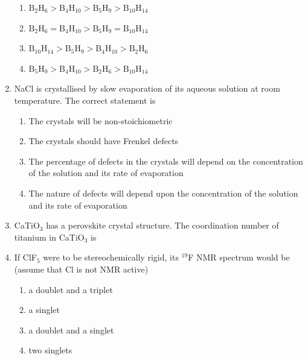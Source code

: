 \documentclass[12pt]{article}
\begin{document}
\begin{enumerate}
\begin{enumerate}
    \item $\mathrm{B_2H_6 > B_4H_{10} > B_5H_9 > B_{10}H_{14}}$
    \item $\mathrm{B_2H_6 = B_4H_{10} > B_5H_9 = B_{10}H_{14}}$
    \item $\mathrm{B_{10}H_{14} > B_5H_9 > B_4H_{10} > B_2H_6}$
    \item $\mathrm{B_5H_9 > B_4H_{10} > B_2H_6 > B_{10}H_{14}}$
\end{enumerate}  \hfill{}


\item NaCl is crystallised by slow evaporation of its aqueous solution at room temperature. The correct statement is
\begin{enumerate}
\item  The crystals will be non-stoichiometric
\item  The crystals should have Frenkel defects
\item  The percentage of defects in the crystals will depend on the concentration of the solution and its rate of evaporation
\item  The nature of defects will depend upon the concentration of the solution and its rate of evaporation    \hfill{}
\end{enumerate}


\item CaTiO$_3$ has a perovskite crystal structure. The coordination number of titanium in CaTiO$_3$ is
\begin{enumerate}
 \hfill{}
\end{enumerate}



\item If ClF$_5$ were to be stereochemically rigid, its $^{19}$F NMR spectrum 
 would be (assume that Cl is not NMR active)
\begin{enumerate}
\item a doublet and a triplet
\item a singlet
\item  a doublet and a singlet
\item two singlets    \hfill{}
\end{enumerate}



\end{enumerate}
\end{document}
